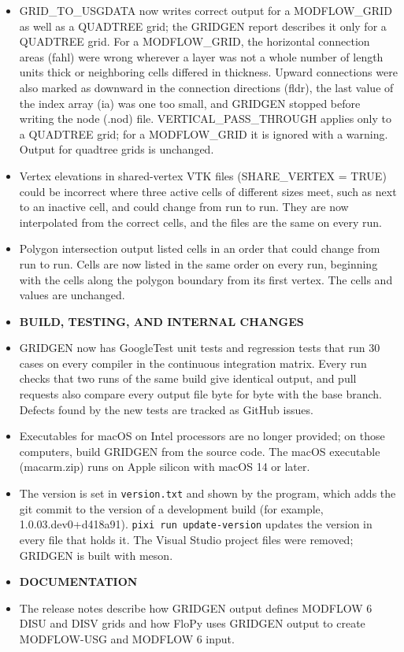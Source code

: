 \begin{itemize}[label=--]
  \item GRID\_TO\_USGDATA now writes correct output for a MODFLOW\_GRID as well as a QUADTREE grid; the GRIDGEN report describes it only for a QUADTREE grid. For a MODFLOW\_GRID, the horizontal connection areas (fahl) were wrong wherever a layer was not a whole number of length units thick or neighboring cells differed in thickness. Upward connections were also marked as downward in the connection directions (fldr), the last value of the index array (ia) was one too small, and GRIDGEN stopped before writing the node (.nod) file. VERTICAL\_PASS\_THROUGH applies only to a QUADTREE grid; for a MODFLOW\_GRID it is ignored with a warning. Output for quadtree grids is unchanged.
  \item Vertex elevations in shared-vertex VTK files (SHARE\_VERTEX = TRUE) could be incorrect where three active cells of different sizes meet, such as next to an inactive cell, and could change from run to run. They are now interpolated from the correct cells, and the files are the same on every run.
  \item Polygon intersection output listed cells in an order that could change from run to run. Cells are now listed in the same order on every run, beginning with the cells along the polygon boundary from its first vertex. The cells and values are unchanged.
  \item[] \textbf{BUILD, TESTING, AND INTERNAL CHANGES}
  \item GRIDGEN now has GoogleTest unit tests and regression tests that run 30 cases on every compiler in the continuous integration matrix. Every run checks that two runs of the same build give identical output, and pull requests also compare every output file byte for byte with the base branch. Defects found by the new tests are tracked as GitHub issues.
  \item Executables for macOS on Intel processors are no longer provided; on those computers, build GRIDGEN from the source code. The macOS executable (macarm.zip) runs on Apple silicon with macOS 14 or later.
  \item The version is set in \texttt{version.txt} and shown by the program, which adds the git commit to the version of a development build (for example, 1.0.03.dev0+d418a91). \texttt{pixi run update-version} updates the version in every file that holds it. The Visual Studio project files were removed; GRIDGEN is built with meson.
  \item[] \textbf{DOCUMENTATION}
  \item The release notes describe how GRIDGEN output defines MODFLOW 6 DISU and DISV grids and how FloPy uses GRIDGEN output to create MODFLOW-USG and MODFLOW 6 input.
\end{itemize}
